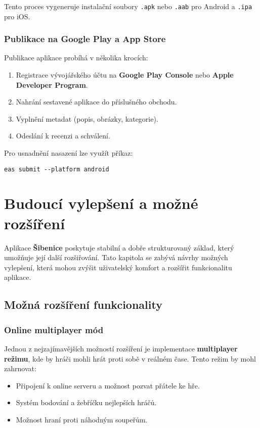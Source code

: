 \documentclass[a4paper,12pt]{article}
\begin{document}
Tento proces vygeneruje instalační soubory \texttt{.apk} nebo \texttt{.aab} pro Android a \texttt{.ipa} pro iOS.

\subsubsection{Publikace na Google Play a App Store}

Publikace aplikace probíhá v několika krocích:
\begin{enumerate}
    \item Registrace vývojářského účtu na \textbf{Google Play Console} nebo \textbf{Apple Developer Program}.
    \item Nahrání sestavené aplikace do příslušného obchodu.
    \item Vyplnění metadat (popis, obrázky, kategorie).
    \item Odeslání k recenzi a schválení.
\end{enumerate}

Pro usnadnění nasazení lze využít příkaz:

\begin{verbatim}
eas submit --platform android
\end{verbatim}

\section{Budoucí vylepšení a možné rozšíření}

Aplikace \textbf{Šibenice} poskytuje stabilní a dobře strukturovaný základ, který umožňuje její další rozšiřování. Tato kapitola se zabývá návrhy možných vylepšení, která mohou zvýšit uživatelský komfort a rozšířit funkcionalitu aplikace.

\subsection{Možná rozšíření funkcionality}

\subsubsection{Online multiplayer mód}

Jednou z nejzajímavějších možností rozšíření je implementace \textbf{multiplayer režimu}, kde by hráči mohli hrát proti sobě v reálném čase. Tento režim by mohl zahrnovat:
\begin{itemize}
    \item Připojení k online serveru a možnost pozvat přátele ke hře.
    \item Systém bodování a žebříčku nejlepších hráčů.
    \item Možnost hraní proti náhodným soupeřům.
\end{itemize}
\end{document}
